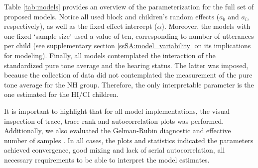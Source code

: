 Table \ref{tab:models} provides an overview of the parameterization for the full set of proposed models. Notice all used block and children's random effects ($a_{b}$ and $a_{i}$, respectively), as well as the fixed effect intercept ($\alpha$). Moreover, the models with one fixed `sample size' used a value of ten, corresponding to number of utterances per child (see supplementary section \ref{ssSA:model_variability} on its implications for modeling). Finally, all models contemplated the interaction of the standardized pure tone average and the hearing status. The latter was imposed, because the collection of data did not contemplated the measurement of the pure tone average for the NH group. Therefore, the only interpretable parameter is the one estimated for the HI/CI children.

It is important to highlight that for all model implementations, the visual inspection of trace, trace-rank and autocorrelation plots was performed. Additionally, we also evaluated the Gelman-Rubin diagnostic and effective number of samples \cite{Gelman_et_al_2014}. In all cases, the plots and statistics indicated the parameters achieved convergence, good mixing and lack of serial autocorrelation, all necessary requirements to be able to interpret the model estimates.

